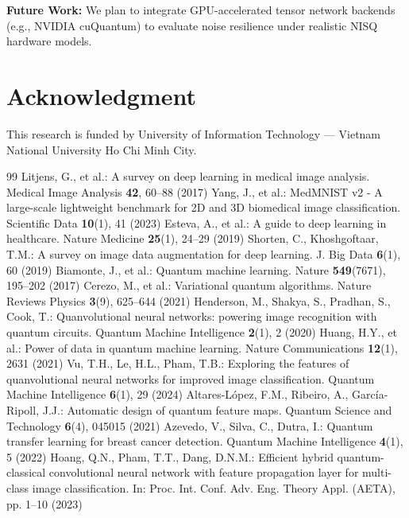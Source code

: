 \documentclass[runningheads]{llncs}
\begin{document}
\textbf{Future Work:} We plan to integrate GPU-accelerated tensor network backends (e.g., NVIDIA cuQuantum) to evaluate noise resilience under realistic NISQ hardware models.

\section*{Acknowledgment}
This research is funded by University of Information Technology --- Vietnam National University Ho Chi Minh City.

\begin{thebibliography}{99}
 Litjens, G., et al.: A survey on deep learning in medical image analysis. Medical Image Analysis \textbf{42}, 60--88 (2017)
 Yang, J., et al.: MedMNIST v2 - A large-scale lightweight benchmark for 2D and 3D biomedical image classification. Scientific Data \textbf{10}(1), 41 (2023)
 Esteva, A., et al.: A guide to deep learning in healthcare. Nature Medicine \textbf{25}(1), 24--29 (2019)
 Shorten, C., Khoshgoftaar, T.M.: A survey on image data augmentation for deep learning. J. Big Data \textbf{6}(1), 60 (2019)
 Biamonte, J., et al.: Quantum machine learning. Nature \textbf{549}(7671), 195--202 (2017)
 Cerezo, M., et al.: Variational quantum algorithms. Nature Reviews Physics \textbf{3}(9), 625--644 (2021)
 Henderson, M., Shakya, S., Pradhan, S., Cook, T.: Quanvolutional neural networks: powering image recognition with quantum circuits. Quantum Machine Intelligence \textbf{2}(1), 2 (2020)
 Huang, H.Y., et al.: Power of data in quantum machine learning. Nature Communications \textbf{12}(1), 2631 (2021)
 Vu, T.H., Le, H.L., Pham, T.B.: Exploring the features of quanvolutional neural networks for improved image classification. Quantum Machine Intelligence \textbf{6}(1), 29 (2024)
 Altares-L{\'o}pez, F.M., Ribeiro, A., Garc{\'i}a-Ripoll, J.J.: Automatic design of quantum feature maps. Quantum Science and Technology \textbf{6}(4), 045015 (2021)
 Azevedo, V., Silva, C., Dutra, I.: Quantum transfer learning for breast cancer detection. Quantum Machine Intelligence \textbf{4}(1), 5 (2022)
 Hoang, Q.N., Pham, T.T., Dang, D.N.M.: Efficient hybrid quantum-classical convolutional neural network with feature propagation layer for multi-class image classification. In: Proc. Int. Conf. Adv. Eng. Theory Appl. (AETA), pp. 1--10 (2023)

\end{thebibliography}
\end{document}
